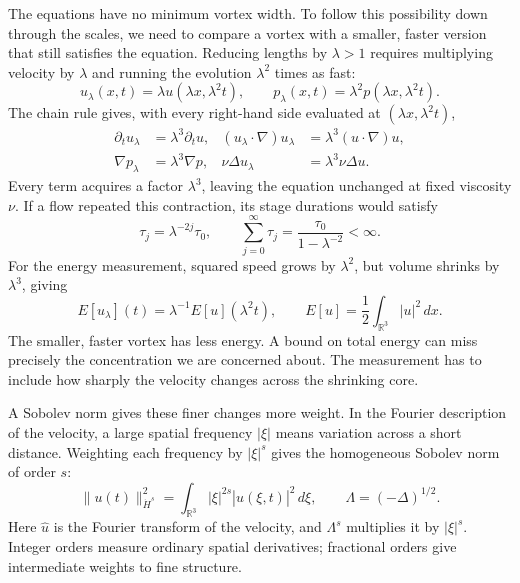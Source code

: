 The equations have no minimum vortex width. To follow this possibility
down through the scales, we need to compare a vortex with a smaller,
faster version that still satisfies the equation. Reducing lengths by
\(\lambda>1\) requires multiplying velocity by \(\lambda\) and running
the evolution \(\lambda^2\) times as fast:
\[
 u_\lambda(x,t)=\lambda u(\lambda x,\lambda^2t),
 \qquad p_\lambda(x,t)=\lambda^2p(\lambda x,\lambda^2t).
\]
The chain rule gives, with every right-hand side evaluated at
\((\lambda x,\lambda^2t)\),
\[
 \begin{aligned}
 \partial_tu_\lambda&=\lambda^3\partial_tu,
 & (u_\lambda\cdot\nabla)u_\lambda&=\lambda^3(u\cdot\nabla)u,\\
 \nabla p_\lambda&=\lambda^3\nabla p,
 & \nu\Delta u_\lambda&=\lambda^3\nu\Delta u.
 \end{aligned}
\]
Every term acquires a factor \(\lambda^3\), leaving the equation unchanged
at fixed viscosity \(\nu\).
If a flow repeated this contraction, its stage durations would satisfy
\[
 \tau_j=\lambda^{-2j}\tau_0,
 \qquad \sum_{j=0}^{\infty}\tau_j
 =\frac{\tau_0}{1-\lambda^{-2}}<\infty.
\]
For the energy measurement, squared speed grows by \(\lambda^2\), but
volume shrinks by \(\lambda^3\), giving
\[
 E[u_\lambda](t)=\lambda^{-1}E[u](\lambda^2t),
 \qquad E[u]=\frac12\int_{\mathbb R^3}|u|^2\,dx.
\]
The smaller, faster vortex has less energy. A bound on total energy can
miss precisely the concentration we are concerned about. The measurement
has to include how sharply the velocity changes across the shrinking core.

A Sobolev norm gives these finer changes more weight. In the Fourier
description of the velocity, a large spatial frequency \(|\xi|\) means
variation across a short distance. Weighting each frequency by
\(|\xi|^s\) gives the homogeneous Sobolev norm of order \(s\):
\[
 \|u(t)\|_{\dot H^s}^2
 =\int_{\mathbb R^3}|\xi|^{2s}|\widehat u(\xi,t)|^2\,d\xi,
 \qquad \Lambda=(-\Delta)^{1/2}.
\]
Here \(\widehat u\) is the Fourier transform of the velocity, and
\(\Lambda^s\) multiplies it by \(|\xi|^s\). Integer orders measure
ordinary spatial derivatives; fractional orders give intermediate weights
to fine structure.

